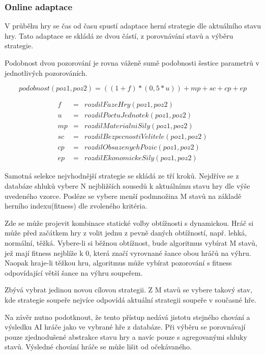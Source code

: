 \subsubsection{Online adaptace}

V průběhu hry se čas od času spustí adaptace herní strategie dle aktuálního stavu hry. Tato adaptace se skládá ze dvou částí, z porovnávání stavů a výběru strategie.

Podobnost dvou pozorování je rovna váženě sumě podobnosti šestice parametrů v jednotlivých pozorováních.

\begin{equation}
	   podobnost(poz1,poz2)=((1+f)*(0,5*u)) + mp + sc + cp + ep
\end{equation}

\begin{eqnarray*}
f &= &rozdilFazeHry(poz1,poz2) \\
u &= &rozdilPoctuJednotek(poz1,poz2) \\
mp &= &rozdilMaterialniSily(poz1,poz2) \\
sc &= &rozdilBezpecnostiVelitele(poz1,poz2) \\
cp &= &rozdilObsazenychPozic(poz1,poz2) \\
ep &= &rozdilEkonomickeSily(poz1,poz2)
\end{eqnarray*}

Samotná selekce nejvhodnější strategie se skládá ze tří kroků. Nejdříve se z databáze shluků vybere N nejbližších sousedů k aktuálnímu stavu hry dle výše uvedeného vzorce. Posléze se vybere menší podmnožina M stavů na základě herního indexu(fitness) dle zvoleného kritéria.

Zde se může projevit kombinace statické volby obtížnosti s dynamickou. Hráč si může před začátkem hry z volit jednu z pevně daných obtížností, např. lehká, normální, těžká. Vybere-li si běžnou obtížnost, bude algoritmus vybírat M stavů, jež mají fitness nejblíže k 0, která značí vyrovnané šance obou hráčů na výhru. Naopak hraje-li těžkou hru, algoritmus může vybírat pozorování s fitness odpovídající větší šance na výhru soupeřem.

Zbývá vybrat jedinou novou cílovou strategii. Z M stavů se vybere takový stav, kde strategie soupeře nejvíce odpovídá aktuální strategii soupeře v současné hře.

Na závěr nutno podotknout, že tento přístup nedává jistotu stejného chování a výsledku AI hráče jako ve vybrané hře z databáze. Při výběru se porovnávají pouze zjednodušené abstrakce stavu hry a navíc pouze s agregovanými shluky stavů. Výsledné chování hráče se může lišit od očekávaného.

